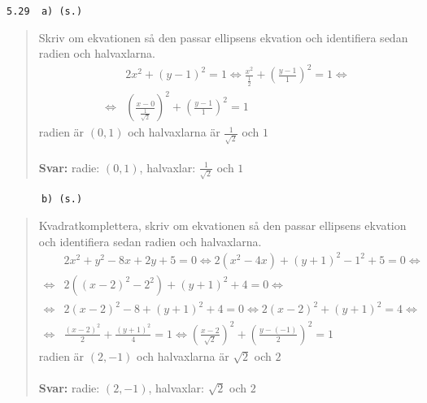 \documentclass[a4paper]{article}
\newcommand{\tskcol}[1]{\textcolor{tskcol}{#1}}
\begin{document}
	\pagebreak
	\texttt{\tskcol{5.29~~a) (s.)}}
	\begin{quotation}
		\noindent
		Skriv om ekvationen så den passar ellipsens ekvation och identifiera sedan radien och halvaxlarna.
		\begin{align*}
		&2x^2+(y-1)^2=1 \Leftrightarrow
		\frac{x^2}{\frac{1}{2}}+\left(\frac{y-1}{1}\right)^2=1 \Leftrightarrow \\ \Leftrightarrow
		&\left(\frac{x-0}{\frac{1}{\sqrt{2}}}\right)^2+\left(\frac{y-1}{1}\right)^2=1
		\end{align*}
		radien är $(0,1)$ och halvaxlarna är $\frac{1}{\sqrt{2}}$ och $1$
		\\ \\
		\textbf{Svar:} radie: $(0,1)$, halvaxlar: $\frac{1}{\sqrt{2}}$ och $1$
	\end{quotation}
	
	\texttt{\tskcol{~~~~~~b) (s.)}}
	\begin{quotation}
		\noindent
		Kvadratkomplettera, skriv om ekvationen så den passar ellipsens ekvation och identifiera sedan radien och halvaxlarna.
		\begin{align*}
		&2x^2+y^2-8x+2y+5=0 \Leftrightarrow
		2(x^2-4x)+(y+1)^2-1^2+5=0 \Leftrightarrow \\ \Leftrightarrow
		&2((x-2)^2-2^2)+(y+1)^2+4=0 \Leftrightarrow \\ \Leftrightarrow
		&2(x-2)^2-8+(y+1)^2+4=0 \Leftrightarrow
		2(x-2)^2+(y+1)^2=4 \Leftrightarrow \\ \Leftrightarrow
		&\frac{(x-2)^2}{2}+ \frac{(y+1)^2}{4}=1 \Leftrightarrow
		\left(\frac{x-2}{\sqrt{2}}\right)^2+\left(\frac{y-(-1)}{2}\right)^2=1
		\end{align*}
		radien är $(2,-1)$ och halvaxlarna är $\sqrt{2}$ och $2$
		\\ \\
		\textbf{Svar:} radie: $(2,-1)$, halvaxlar: $\sqrt{2}$ och $2$
	\end{quotation}
	
\end{document}
